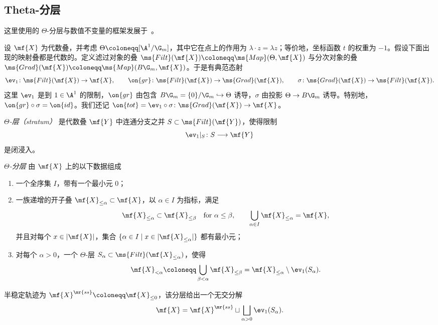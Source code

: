 \subsection{Theta-分层}%
\label{sub:Theta-stratifications}

这里使用的 \(\Theta\)-分层与数值不变量的框架发展于~\cite{HLinstability}。

设 \(\mf{X}\) 为代数叠，并考虑 \(\Theta\coloneqq[\A^1/\G_m]\)，其中它在点上的作用为 \(\lambda\cdot z=\lambda z\)；等价地，坐标函数 \(t\) 的权重为 \(-1\)。假设下面出现的映射叠都是代数的。定义滤过对象的叠 \(\ms{Filt}(\mf{X})\coloneqq\ms{Map}(\Theta,\mf{X})\) 与分次对象的叠 \(\ms{Grad}(\mf{X})\coloneqq\ms{Map}(B\G_m,\mf{X})\)。于是有典范态射
\[
    \ev_1\colon\ms{Filt}(\mf{X})\to\mf{X},
    \qquad
    \on{gr}\colon\ms{Filt}(\mf{X})\to\ms{Grad}(\mf{X}),
    \qquad
    \sigma\colon\ms{Grad}(\mf{X})\to\ms{Filt}(\mf{X}).
\]
这里 \(\ev_1\) 是到 \(1\in\A^1\) 的限制，\(\on{gr}\) 由包含 \(B\G_m=\{0\}/\G_m\hookrightarrow\Theta\) 诱导，\(\sigma\) 由投影 \(\Theta\to B\G_m\) 诱导。特别地，\(\on{gr}\circ\sigma=\on{id}\)。我们还记 \(\on{tot}=\ev_1\circ\sigma\colon\ms{Grad}(\mf{X})\to\mf{X}\)。

\begin{defn}
    \textit{\(\Theta\)-层（stratum）} 是代数叠 \(\mf{Y}\) 中连通分支之并 \(S\subset\ms{Filt}(\mf{Y})\)，使得限制
    \[
        \ev_1|_S\colon S\longrightarrow\mf{Y}
    \]
    是闭浸入。

    \textit{\(\Theta\)-分层} 由 \(\mf{X}\) 上的以下数据组成
    \begin{enumerate}
        \item 一个全序集 \(I\)，带有一个最小元 \(0\)；
        \item 一族递增的开子叠 \(\mf{X}_{\leq\alpha}\subset\mf{X}\)，以 \(\alpha\in I\) 为指标，满足
        \[
            \mf{X}_{\leq\alpha}\subset\mf{X}_{\leq\beta}
            \quad\text{for }\alpha\leq\beta,
            \qquad
            \bigcup_{\alpha\in I}\mf{X}_{\leq\alpha}=\mf{X},
        \]
        并且对每个 \(x\in|\mf{X}|\)，集合 \(\{\alpha\in I\mid x\in|\mf{X}_{\leq\alpha}|\}\) 都有最小元；
        \item 对每个 \(\alpha>0\)，一个 \(\Theta\)-层 \(S_\alpha\subset\ms{Filt}(\mf{X}_{\leq\alpha})\)，使得
        \[
            \mf{X}_{<\alpha}
            \coloneqq
            \bigcup_{\beta<\alpha}\mf{X}_{\leq\beta}
            =
            \mf{X}_{\leq\alpha}\setminus\ev_1(S_\alpha).
        \]
    \end{enumerate}
    半稳定轨迹为 \(\mf{X}^{\mr{ss}}\coloneqq\mf{X}_{\leq0}\)，该分层给出一个无交分解
    \[
        \mf{X}
        =
        \mf{X}^{\mr{ss}}
        \sqcup
        \bigsqcup_{\alpha>0}\ev_1(S_\alpha).
    \]
\end{defn}

